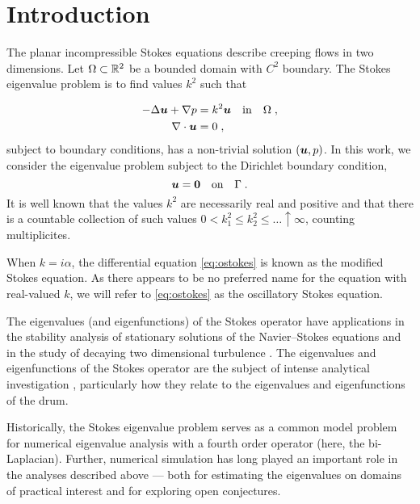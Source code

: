 \section{Introduction}

The planar incompressible Stokes equations describe
creeping flows in two dimensions.
%
Let $\Omega \subset \mathbb{R}^2$
be a bounded domain with $C^2$ boundary.
%
The Stokes eigenvalue problem is to find
values $k^2$ such that 

\begin{equation}
\begin{aligned}
  -\Delta {\boldsymbol u} + \nabla p &= k^2 {\boldsymbol u} \quad \textrm{in} \quad
  \Omega \label{eq:ostokes} \; , \\
  \nabla \cdot {\boldsymbol u} &= 0 \; ,
\end{aligned}
\end{equation}
subject to boundary conditions, has a non-trivial solution $({\boldsymbol u},p)$.
%
In this work, we consider the eigenvalue problem subject to 
the Dirichlet boundary condition,
\begin{equation}
  {\boldsymbol u} = {\boldsymbol 0} \quad \textrm{on} \quad \Gamma \label{eq:ostokes_dir} \; .
\end{equation}
It is well known that the values $k^2$ are necessarily
real and positive and that there is a countable collection of such
values $0 < k_{1}^{2} \leq k_{2}^2 \leq \ldots \uparrow \infty$,
counting multiplicites.

\begin{remark}
  When $k = i\alpha$, the differential equation
  \cref{eq:ostokes} is known as the modified Stokes
  equation. As there appears to be no preferred
  name for the equation with real-valued $k$,
  we will refer to \cref{eq:ostokes} as the
  oscillatory Stokes equation.
\end{remark}

The eigenvalues (and eigenfunctions)
of the Stokes operator have applications in the
stability analysis of stationary solutions of the
Navier--Stokes equations \cite{osborn1976approximation}
and in the study of decaying two dimensional turbulence
\cite{schneider2008final}.
%
The eigenvalues and eigenfunctions of the Stokes
operator are the subject of intense analytical
investigation
\cite{taylor1933buckling,szego1950membranes,
  polya1951isoperimetric,bramble1963pointwise,
  ashbaugh1996fundamental,leriche2004stokes,
  kelliher2009eigenvalues,antunes2011buckling},
particularly how they relate to the eigenvalues and
eigenfunctions of the drum.

Historically, the Stokes eigenvalue problem serves as a
common model problem for numerical eigenvalue analysis
with a fourth order operator (here, the bi-Laplacian).
%
Further, numerical simulation has long played an
important role in the analyses described above --- both for
estimating the eigenvalues on domains of practical
interest and for exploring open conjectures.

